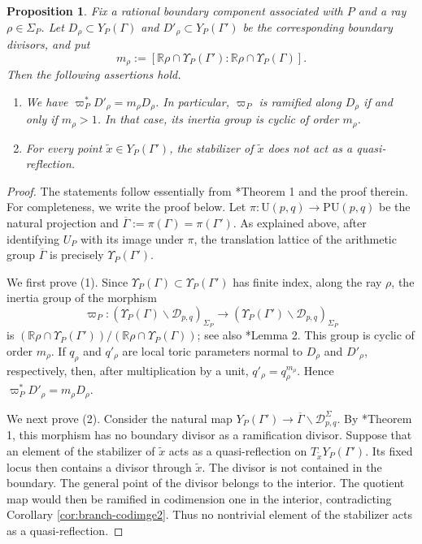 \documentclass[11pt]{amsart}
\theoremstyle{plain}
\newtheorem{prop}[thm]{Proposition}
\theoremstyle{definition}
\numberwithin{equation}{section}
\def\U{\mathrm{U}}
\begin{document}
\begin{prop}
\label{prop:boundary-no-qref}
Fix a rational boundary component associated with $P$ and a ray
$\rho\in\Sigma_P$. Let $D_\rho\subset Y_P(\Gamma)$ and
$D'_\rho\subset Y_P(\Gamma')$ be the corresponding boundary divisors,
and put
\[
  m_\rho
  :=
  \left[
    \mathbb R\rho\cap\Upsilon_P(\Gamma')
    :
    \mathbb R\rho\cap\Upsilon_P(\Gamma)
  \right].
\]
Then the following assertions hold.

\begin{enumerate}
\item
We have $\varpi_P^*D'_\rho=m_\rho D_\rho$.
In particular, $\varpi_P$ is ramified along $D_\rho$ if and only if
$m_\rho>1$. In that case, its inertia group is cyclic of order
$m_\rho$.
\item
For every point $\widetilde{x}\in Y_P(\Gamma')$, the stabilizer of $\widetilde{x}$ does not act as a quasi-reflection.
\end{enumerate}
\end{prop}
\begin{proof}
The statements follow essentially from \cite{ma2022boundary}*{Theorem 1} and the proof therein. 
For completeness, we write the proof below.
Let $\pi:\U(p,q)\to\mathrm{PU}(p,q)$ be the natural projection and
$\overline{\Gamma}:=\pi(\Gamma)=\pi(\Gamma')$.
As explained above, after identifying $U_P$ with its image under
$\pi$, the translation lattice of the arithmetic group
$\overline{\Gamma}$ is precisely $\Upsilon_P(\Gamma')$.

We first prove (1). Since
$\Upsilon_P(\Gamma)\subset\Upsilon_P(\Gamma')$ has finite index, along the ray $\rho$, the inertia group of the morphism
\[
\varpi_P:
(\Upsilon_P(\Gamma)\backslash\mathcal D_{p,q})_{\Sigma_P}
\longrightarrow
(\Upsilon_P(\Gamma')\backslash\mathcal D_{p,q})_{\Sigma_P}
\]
is $(\mathbb R\rho\cap\Upsilon_P(\Gamma'))/(\mathbb R\rho\cap\Upsilon_P(\Gamma))$;
see also \cite{ma2022boundary}*{Lemma 2}.
This group is cyclic of order $m_\rho$.
If $q_\rho$ and $q'_\rho$ are local toric parameters normal to
$D_\rho$ and $D'_\rho$, respectively, then, after multiplication
by a unit, $q'_\rho=q_\rho^{m_\rho}$.
Hence $\varpi_P^*D'_\rho=m_\rho D_\rho$.

We next prove (2).
Consider the natural map $Y_P(\Gamma')
\to
\overline{\Gamma}\backslash\mathcal D_{p,q}^{\Sigma}$.
 By \cite{ma2022boundary}*{Theorem 1}, this
morphism has no boundary divisor as a ramification divisor.
Suppose that an element of the stabilizer of
$\widetilde{x}$ acts as a quasi-reflection on
$T_{\widetilde{x}}Y_P(\Gamma')$.
Its fixed locus then contains a divisor through
$\widetilde{x}$.
The divisor is not contained in the boundary.
The general point of the divisor belongs to
the interior. 
The quotient map would then be ramified in codimension
one in the interior, contradicting Corollary
\ref{cor:branch-codimge2}.
Thus no nontrivial element of the stabilizer acts as a
quasi-reflection.
\end{proof}
\end{document}

